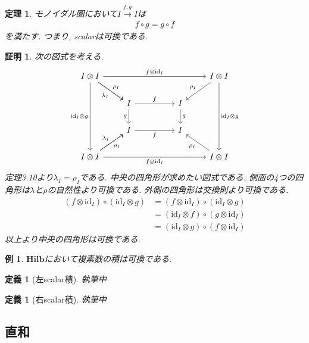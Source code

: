 \documentclass[a4paper,12pt]{ltjsarticle}
\theoremstyle{break}
\newtheorem{defn}[thm]{定義}
\newtheorem{thrm}[thm]{定理}
\newtheorem{eg}[thm]{例}
\newtheorem*{prf}{証明}
\newcommand{\hilb}{\mathbf{Hilb}}
\newcommand{\xr}[1]{\xrightarrow{#1}}
\newcommand{\id}{\mathrm{id}}
\newcommand{\ci}{\circ}
\newcommand{\la}{\lambda}
\newcommand{\ot}{\otimes}
\numberwithin{equation}{section}
\begin{document}
\begin{thrm}
  モノイダル圏において$I \xr{f,g} I$は
  \begin{align*}
    f \ci g = g \ci f
  \end{align*}
  を満たす. 
  つまり, scalarは可換である. 
\end{thrm} 

\begin{prf}
  次の図式を考える. 
  \[\begin{tikzcd}
    {I \ot I} &&&& {I \ot I} \\
    & I && I \\
    & I && I \\
    {I \ot I} &&&& {I \ot I}
    \arrow["f", from=2-2, to=2-4]
    \arrow["g"', from=2-2, to=3-2]
    \arrow["f"', from=3-2, to=3-4]
    \arrow["g", from=2-4, to=3-4]
    \arrow["{\la_I}"', from=1-1, to=2-2]
    \arrow["{\id_I \ot g}"', from=1-1, to=4-1]
    \arrow["{f \ot \id_I}"', from=4-1, to=4-5]
    \arrow["{\id_I \ot g}", from=1-5, to=4-5]
    \arrow["{\rho_I}"', from=1-5, to=2-4]
    \arrow["{f \ot \id_I}", from=1-1, to=1-5]
    \arrow["{\la_I}", from=4-1, to=3-2]
    \arrow["{\rho_I}"', from=4-1, to=3-2]
    \arrow["{\rho_I}", from=4-5, to=3-4]
    \arrow["{\rho_I}", from=1-1, to=2-2]
  \end{tikzcd}\]
  定理3.10より$\la_I=\rho_I$である. 
  中央の四角形が求めたい図式である. 
  側面の4つの四角形は$\la$と$\rho$の自然性より可換である. 
  外側の四角形は交換則より可換である. 
  \begin{align*}
    (f \ot \id_I) \ci (\id_I \ot g)
    &= (f \ot \id_I) \ci (\id_I \ot g) \\
    &= (\id_I \ot f) \ci (g \ot \id_I) \\
    &= (\id_I \ot g) \ci (f \ot \id_I)
  \end{align*}
  以上より中央の四角形は可換である. 
\end{prf}

\begin{eg}
  $\hilb$において複素数の積は可換である. 
\end{eg} 

\begin{defn}[左scalar積]
  執筆中
\end{defn}

\begin{defn}[右scalar積]
  執筆中
\end{defn}

\subsection{直和}
\end{document}
